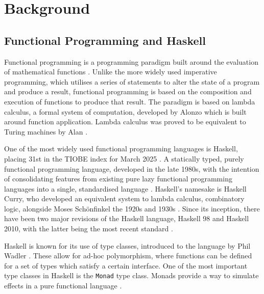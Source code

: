 \documentclass[../main.tex]{subfiles}
\begin{document}
\chapter{Background} \label{ch:background}
    \section{Functional Programming and Haskell}
        Functional programming is a programming paradigm built around the evaluation of
            mathematical functions \citep{fpPaulHudak}.
        Unlike the more widely used imperative programming, which utilises a series of
            statements to alter the state of a program and produce a result, functional
            programming is based on the composition and execution of functions to produce
            that result.
        The paradigm is based on lambda calculus, a formal system of computation,
            developed by Alonzo \citet{lambdaCalculus} which is built around function
            application.
        Lambda calculus was proved to be equivalent to Turing machines by Alan
            \citet{lambdaTuringComplete}.

        One of the most widely used functional programming languages is Haskell,
            placing 31st in the TIOBE index for March 2025 \citep{tiobeIndex}.
        A statically typed, purely functional programming language, developed in the
            late 1980s, with the intention of consolidating features from existing pure
            lazy functional programming languages into a single, standardised language
            \citep{haskellHistory}.
        Haskell's namesake is Haskell Curry, who developed an equivalent system to
            lambda calculus, combinatory logic, alongside Moses Schönfinkel the 1920s and
            1930s \citep{combinatoryLogic}.
        Since its inception, there have been two major revisions of the Haskell
            language, Haskell 98 and Haskell 2010, with the latter being the most recent
            standard \citep{haskell2010}.

        Haskell is known for its use of type classes, introduced to the language by
            Phil Wadler \citep{typeClasses}.
        These allow for ad-hoc polymorphism, where functions can be defined for a set
            of types which satisfy a certain interface.
        One of the most important type classes in Haskell is the \texttt{Monad} type
            class.
        Monads provide a way to simulate effects in a pure functional language
            \citep{monads}.
\end{document}
